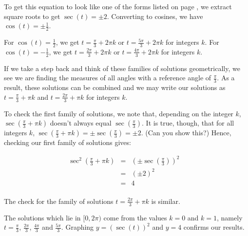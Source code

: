 \documentclass{ximera}
\begin{document}
\begin{example}
\begin{enumerate}
\smallskip

To get this equation to look like one of the forms listed on page \pageref{trigeqnstrategy1}, we extract square roots to get $\sec(t) = \pm 2$. Converting to cosines, we have  $\cos(t) = \pm \frac{1}{2}$.  

\smallskip

For $\cos(t) = \frac{1}{2}$, we get $t = \frac{\pi}{3} + 2\pi k$ or $t = \frac{5\pi}{3} + 2\pi k$ for integers $k$.  For $\cos(t) = -\frac{1}{2}$, we get $t = \frac{2\pi}{3} + 2\pi k$ or $t = \frac{4\pi}{3} + 2\pi k$ for integers $k$. 

\smallskip

If we take a step back and think of these families of solutions geometrically, we see we are finding the measures of all angles with a reference angle of $\frac{\pi}{3}$.  As a result, these solutions can be combined and we may write our solutions as $t = \frac{\pi}{3} + \pi k$ and $t = \frac{2\pi}{3} + \pi k$ for integers $k$. 

\smallskip

To check the first family of solutions, we note that, depending on the integer $k$,  $\sec\left(\frac{\pi}{3} + \pi k\right)$ doesn't always equal $\sec\left(\frac{\pi}{3}\right)$.  It is true, though,  that for all integers $k$,  $\sec\left(\frac{\pi}{3} + \pi k\right) = \pm \sec\left(\frac{\pi}{3}\right) = \pm 2$.  (Can you show this?)  Hence, checking our first family of solutions gives:


\[ \begin{array}{rclr}

\sec^{2}\left(\frac{\pi}{3} + \pi k\right)  &  = &  \left( \pm \sec\left(\frac{\pi}{3}\right)\right)^2  & \\ [3pt]
																												& =  &   (\pm 2)^2 &  \\ [3pt]
																												& =  & 4 & \\
																								
\end{array}\] 

The check for the family of solutions $t =\frac{2\pi}{3} + \pi k$ is similar. 

\smallskip

 The solutions which lie in $[0,2\pi)$ come from the values $k = 0$ and $k=1$, namely $t = \frac{\pi}{3}$, $\frac{2\pi}{3}$, $\frac{4\pi}{3}$ and $\frac{5\pi}{3}$.  Graphing $y = (\sec(t))^2$ and $y=4$ confirms our results.  

\begin{center}



\end{center}
\end{enumerate}
\end{example}
\end{document}
